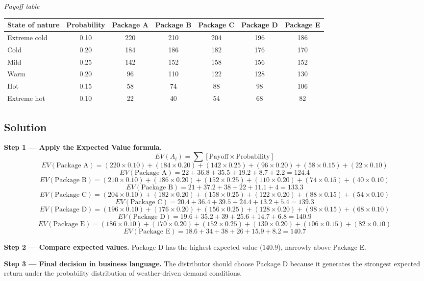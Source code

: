 \begin{ExamProblems}
		\begin{center}
			\textit{Payoff table}
			\begin{tabular}{l c c c c c c}
				\toprule
				State of nature & Probability & Package A & Package B & Package C & Package D & Package E \\
				\midrule
				Extreme cold & 0.10 & 220 & 210 & 204 & 196 & 186 \\
				Cold & 0.20 & 184 & 186 & 182 & 176 & 170 \\
				Mild & 0.25 & 142 & 152 & 158 & 156 & 152 \\
				Warm & 0.20 & 96 & 110 & 122 & 128 & 130 \\
				Hot & 0.15 & 58 & 74 & 88 & 98 & 106 \\
				Extreme hot & 0.10 & 22 & 40 & 54 & 68 & 82 \\
				\bottomrule
			\end{tabular}
		\end{center}

		\subsection*{Solution}
		\textbf{Step 1 --- Apply the Expected Value formula.}
		\[
		EV(A_i)=\sum [\text{Payoff}\times\text{Probability}]
		\]
		\[
		EV(\text{Package A})=(220\times0.10)+(184\times0.20)+(142\times0.25)+(96\times0.20)+(58\times0.15)+(22\times0.10)
		\]
		\[
		EV(\text{Package A})=22+36.8+35.5+19.2+8.7+2.2=124.4
		\]
		\[
		EV(\text{Package B})=(210\times0.10)+(186\times0.20)+(152\times0.25)+(110\times0.20)+(74\times0.15)+(40\times0.10)
		\]
		\[
		EV(\text{Package B})=21+37.2+38+22+11.1+4=133.3
		\]
		\[
		EV(\text{Package C})=(204\times0.10)+(182\times0.20)+(158\times0.25)+(122\times0.20)+(88\times0.15)+(54\times0.10)
		\]
		\[
		EV(\text{Package C})=20.4+36.4+39.5+24.4+13.2+5.4=139.3
		\]
		\[
		EV(\text{Package D})=(196\times0.10)+(176\times0.20)+(156\times0.25)+(128\times0.20)+(98\times0.15)+(68\times0.10)
		\]
		\[
		EV(\text{Package D})=19.6+35.2+39+25.6+14.7+6.8=140.9
		\]
		\[
		EV(\text{Package E})=(186\times0.10)+(170\times0.20)+(152\times0.25)+(130\times0.20)+(106\times0.15)+(82\times0.10)
		\]
		\[
		EV(\text{Package E})=18.6+34+38+26+15.9+8.2=140.7
		\]
		
		\textbf{Step 2 --- Compare expected values.}
		Package D has the highest expected value ($140.9$), narrowly above Package E.
		
		\textbf{Step 3 --- Final decision in business language.}
		The distributor should choose Package D because it generates the strongest expected return under the probability distribution of weather-driven demand conditions.
		

\end{ExamProblems}

